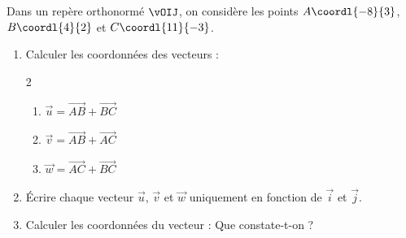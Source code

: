 \begin{exo}{}
	Dans un repère orthonormé $\vOIJ$, on considère les points $A\coordl{-8}{3}$, $B\coordl{4}{2}$ et $C\coordl{11}{-3}$.

	\begin{enumerate}
		\item Calculer les coordonnées des vecteurs :
		      \vspace*{-2mm}
		      \begin{multicols}{2}
		      \begin{enumerate}[itemsep=2mm]
			      \item $\vec{u} = \vec{AB} + \vec{BC}$
			      \item $\vec{v} = \vec{AB} + \vec{AC}$
			      \item $\vec{w} = \vec{AC} + \vec{BC}$
		      \end{enumerate}
		      \end{multicols}
		      \vspace*{-2mm}
		\item Écrire chaque vecteur $\vec{u}$, $\vec{v}$ et $\vec{w}$ uniquement en fonction de $\vec{i}$ et $\vec{j}$.
		\item Calculer les coordonnées du vecteur : Que constate-t-on ?
	\end{enumerate}
\end{exo}
